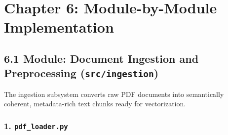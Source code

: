 \documentclass[
]{article}
\begin{document}
\endgroup

\section{Chapter 6: Module-by-Module
Implementation}\label{chapter-6-module-by-module-implementation}

\subsection{\texorpdfstring{6.1 Module: Document Ingestion and
Preprocessing
(\texttt{src/\allowbreak ingestion})}{6.1 Module: Document Ingestion and Preprocessing (src/ingestion)}}\label{module-document-ingestion-and-preprocessing-srcingestion}

The ingestion subsystem converts raw PDF documents into semantically
coherent, metadata-rich text chunks ready for vectorization.

\subsubsection{\texorpdfstring{1.
\texttt{pdf\_\allowbreak loader.\allowbreak py}}{1. pdf\_loader.py}}\label{pdf_loader.py}
\end{document}
